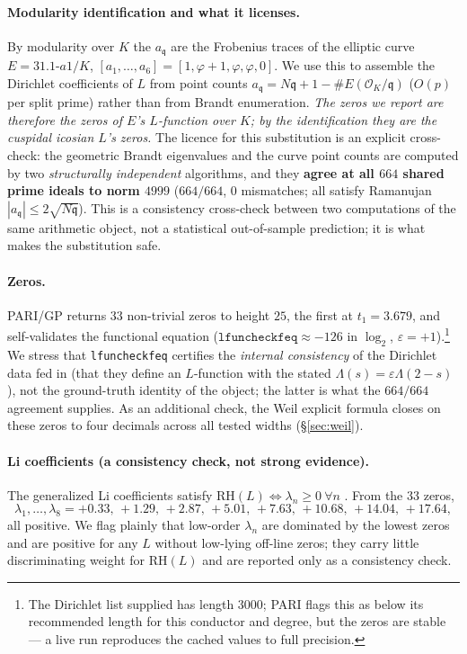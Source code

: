 \documentclass[11pt]{article}
\theoremstyle{remark}
\newcommand{\OO}{\mathcal{O}}
\newcommand{\KK}{K}
\newcommand{\RH}{\mathrm{RH}}
\newcommand{\fq}{\mathfrak{q}}
\begin{document}
\paragraph{Modularity identification and what it licenses.} By modularity over $\KK$ the
$a_\fq$ are the Frobenius traces of the elliptic curve $E=31.1\text{-}a1/\KK$,
$[a_1,\dots,a_6]=[1,\varphi+1,\varphi,\varphi,0]$. We use this to assemble the Dirichlet
coefficients of $L$ from point counts $a_\fq=N\fq+1-\#E(\OO_\KK/\fq)$ ($O(p)$ per split
prime) rather than from Brandt enumeration. \emph{The zeros we report are therefore the
zeros of $E$'s $L$-function over $\KK$; by the identification they are the cuspidal icosian
$L$'s zeros.} The licence for this substitution is an explicit cross-check: the geometric
Brandt eigenvalues and the curve point counts are computed by two \emph{structurally
independent} algorithms, and they \textbf{agree at all $664$ shared prime ideals to norm
$4999$} ($664/664$, $0$ mismatches; all satisfy Ramanujan $|a_\fq|\le2\sqrt{N\fq}$). This
is a consistency cross-check between two computations of the same arithmetic object, not a
statistical out-of-sample prediction; it is what makes the substitution safe.

\paragraph{Zeros.} PARI/GP \cite{PARI} returns $33$ non-trivial zeros to height $25$, the
first at $t_1=3.679$, and self-validates the functional equation
($\texttt{lfuncheckfeq}\approx-126$ in $\log_2$, $\varepsilon=+1$).\footnote{The Dirichlet
list supplied has length $3000$; PARI flags this as below its recommended length for this
conductor and degree, but the zeros are stable --- a live run reproduces the cached values
to full precision.} We stress that
\texttt{lfuncheckfeq} certifies the \emph{internal consistency} of the Dirichlet data fed
in (that they define an $L$-function with the stated $\Lambda(s)=\varepsilon\Lambda(2-s)$),
not the ground-truth identity of the object; the latter is what the $664/664$ agreement
supplies. As an additional check, the Weil explicit formula closes on these zeros to four
decimals across all tested widths (\S\ref{sec:weil}).

\paragraph{Li coefficients (a consistency check, not strong evidence).} The generalized Li
coefficients satisfy $\RH(L)\iff\lambda_n\ge0\ \forall n$ \cite{Li97,BL99}. From the $33$
zeros,
\[
\lambda_1,\dots,\lambda_8=+0.33,\,+1.29,\,+2.87,\,+5.01,\,+7.63,\,+10.68,\,+14.04,\,+17.64,
\]
all positive. We flag plainly that low-order $\lambda_n$ are dominated by the lowest zeros and
are positive for any $L$ without low-lying off-line zeros; they carry little discriminating
weight for $\RH(L)$ and are reported only as a consistency check.
\end{document}
